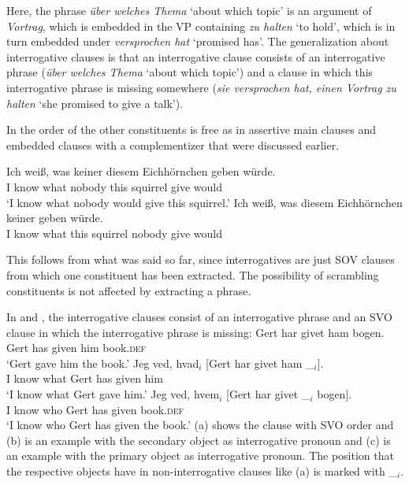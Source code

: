 \largerpage
\noindent
Here, the phrase \emph{über welches Thema} `about which topic' is an argument of \emph{Vortrag},
which is embedded in the VP containing \emph{zu halten} `to hold', which is in turn embedded under
\emph{versprochen hat} `promised has'. The generalization about interrogative clauses is that an
interrogative clause consists of an interrogative phrase (\emph{über welches Thema} `about which
topic') and a clause in which this interrogative phrase is missing somewhere (\emph{sie versprochen
  hat, einen Vortrag zu halten} `she promised to give a talk').

In  the order of the other constituents is free as in assertive main clauses and embedded
clauses with a complementizer that were discussed earlier. 

\eal
\ex
\gll Ich weiß, was keiner diesem Eichhörnchen geben würde.\\
     I know    what nobody this squirrel give would\\
\glt `I know what nobody would give this squirrel.'
\ex 
\gll Ich weiß, was diesem Eichhörnchen keiner geben würde.\\
     I know what this squirrel nobody give would\\
\zl

\noindent
This follows from what was said so far, since interrogatives are just SOV clauses from which one
constituent has been extracted. The possibility of scrambling constituents is not affected by extracting a phrase.

\largerpage
In  and , the interrogative clauses consist of an interrogative phrase and an SVO clause
in which the interrogative phrase is missing:
\eal
\ex 
\gll Gert har givet ham bogen.\\
     Gert has given him book.\textsc{def}\\
\glt `Gert gave him the book.'
\ex
\gll Jeg ved, hvad$_i$ [Gert har givet ham \_$_i$].\\
     I know what \spacebr{}Gert has given him\\
\glt `I know what Gert gave him.'
\ex
\gll Jeg ved, hvem$_i$ [Gert har givet \_$_i$   bogen].\\
     I know who        \spacebr{}Gert has given {} book.\textsc{def}\\
\glt `I know who Gert has given the book.'
\zl
(a) shows the clause with SVO order and (b) is an example with the secondary object as
interrogative pronoun and (c) is an example with the primary object as interrogative
pronoun. The position that the respective objects have in non-interrogative clauses like (a)
is marked with \_$_i$.

